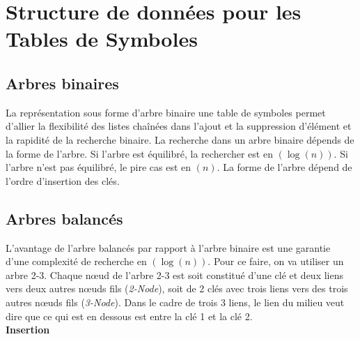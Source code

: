 \section{Structure de données pour les Tables de Symboles}
\subsection{Arbres binaires}
La représentation sous forme d'arbre binaire une table de symboles permet d'allier la flexibilité des listes chaînées dans l'ajout et la suppression d'élément et la rapidité de la recherche binaire. La recherche dans un arbre binaire dépends de la forme de l'arbre. Si l'arbre est équilibré, la rechercher est en \bigO$(\log(n))$. Si l'arbre n'est pas équilibré, le pire cas est en \bigO$(n)$. La forme de l'arbre dépend de l'ordre d'insertion des clés.
\subsection{Arbres balancés}
L'avantage de l'arbre balancés par rapport à l'arbre binaire est une garantie d'une complexité de recherche en \bigO$(\log(n))$. Pour ce faire, on va utiliser un arbre 2-3.  Chaque nœud de l'arbre 2-3 est soit constitué d'une clé et deux liens vers deux autres nœuds fils (\emph{2-Node}), soit de 2 clés avec trois liens vers des trois autres nœuds fils (\emph{3-Node}). Dans le cadre de trois 3 liens, le lien du milieu veut dire que ce qui est en dessous est entre la clé 1 et la clé 2.\\
\textbf{Insertion}\\

